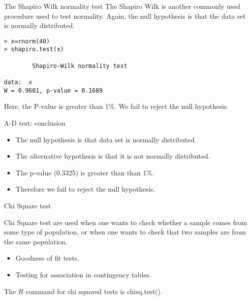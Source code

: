 \documentclass[pdf,default,slideColor,colorBG]{prosper}
\begin{document}
\begin{slide}{The Shapiro Wilk normality test}
The Shapiro Wilk is another commonly used procedure used to test normality.
Again, the null hypothesis is that the data set is normally distributed.
\begin{verbatim}
> x=rnorm(40)
> shapiro.test(x)

        Shapiro-Wilk normality test

data:  x
W = 0.9601, p-value = 0.1689
\end{verbatim}
Here, the P-value is greater than 1\%. We fail to reject the null hypothesis.
\end{slide}

\begin{slide}{A-D test: conclusion}
\begin{itemize}
\item The null hypothesis is that data set is normally distributed.
\item The alternative hypothesis is that it is not normally distributed.
\item The p-value (0.3325) is greater than than 1\%.
\item Therefore we fail to reject the null hypothesis.
\end{itemize}
\end{slide}

\begin{slide}{Chi Square test}

Chi Square test are used when one wants to check whether a sample comes from some type of population,
or when one wants to check that two samples are from the same population.

\begin{itemize}
\item Goodness of fit tests.
\item Testing for association in contingency tables.
\end{itemize}

The $R$ command for chi squared tests is chisq.test().
\end{slide}
\end{document}
